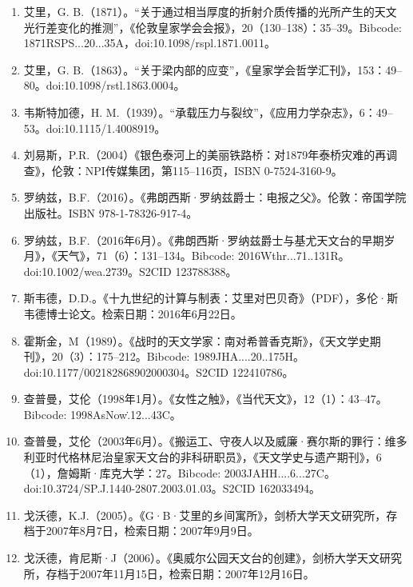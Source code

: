\begin{enumerate}
\item 艾里，G. B.（1871）。“关于通过相当厚度的折射介质传播的光所产生的天文光行差变化的推测”，《伦敦皇家学会会报》，20（130–138）：35–39。Bibcode: 1871RSPS...20...35A，doi:10.1098/rspl.1871.0011。
\item 艾里，G. B.（1863）。“关于梁内部的应变”，《皇家学会哲学汇刊》，153：49–80。doi:10.1098/rstl.1863.0004。
\item 韦斯特加德，H. M.（1939）。“承载压力与裂纹”，《应用力学杂志》，6：49–53。doi:10.1115/1.4008919。
\item 刘易斯，P.R.（2004）《银色泰河上的美丽铁路桥：对1879年泰桥灾难的再调查》，伦敦：NPI传媒集团，第115–116页，ISBN 0-7524-3160-9。
\item 罗纳兹，B.F.（2016）。《弗朗西斯·罗纳兹爵士：电报之父》。伦敦：帝国学院出版社。ISBN 978-1-78326-917-4。
\item 罗纳兹，B.F.（2016年6月）。《弗朗西斯·罗纳兹爵士与基尤天文台的早期岁月》，《天气》，71（6）：131–134。Bibcode: 2016Wthr...71..131R。doi:10.1002/wea.2739。S2CID 123788388。
\item 斯韦德，D.D.。《十九世纪的计算与制表：艾里对巴贝奇》（PDF），多伦·斯韦德博士论文。检索日期：2016年6月22日。
\item 霍斯金，M（1989）。《战时的天文学家：南对希普香克斯》，《天文学史期刊》，20（3）：175–212。Bibcode: 1989JHA....20..175H。doi:10.1177/002182868902000304。S2CID 122410786。
\item 查普曼，艾伦（1998年1月）。《女性之触》，《当代天文》，12（1）：43–47。Bibcode: 1998AsNow\..12...43C。
\item 查普曼，艾伦（2003年6月）。《搬运工、守夜人以及威廉·赛尔斯的罪行：维多利亚时代格林尼治皇家天文台的非科研职员》，《天文学史与遗产期刊》，6（1），詹姆斯·库克大学：27。Bibcode: 2003JAHH....6...27C。doi:10.3724/SP.J.1440-2807.2003.01.03。S2CID 162033494。
\item 戈沃德，K.J.（2005）。《G·B·艾里的乡间寓所》，剑桥大学天文研究所，存档于2007年8月7日，检索日期：2007年9月9日。
\item 戈沃德，肯尼斯·J（2006）。《奥威尔公园天文台的创建》，剑桥大学天文研究所，存档于2007年11月15日，检索日期：2007年12月16日。

\end{enumerate}